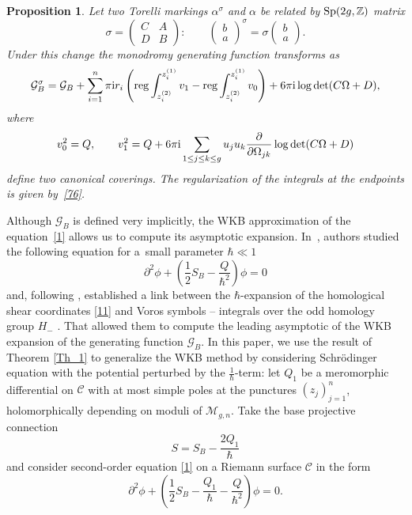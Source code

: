 \documentclass[pdftex]{sigma}
\numberwithin{equation}{section}
\newtheorem{Proposition}[Theorem]{Proposition}
\theoremstyle{definition}
\newcommand{\Z}{\mathbb{Z}}
\begin{document}
\begin{Proposition}
Let two Torelli markings $\alpha^\sigma$ and $\alpha$ be related by ${\rm Sp}(2g,\Z)$ matrix
\begin{equation*}
\sigma=\begin{pmatrix}
C & A \\
D & B
\end{pmatrix}\colon \qquad
\begin{pmatrix}
b \\
a
\end{pmatrix}^{\sigma}= \sigma
\begin{pmatrix}
b \\
a
\end{pmatrix}.
\end{equation*}
Under this change the monodromy generating function transforms as
\begin{equation*}
\mathcal{G}^{\sigma}_B=\mathcal{G}_B+\sum^n_{i=1}\pi {\rm i} r_i\left({\rm reg}\int^{z^{(1)}_i}_{z^{(2)}_i}v_1 -{\rm reg}\int^{z^{(1)}_i}_{z^{(2)}_i}v_0 \right) +6 \pi {\rm i} \log \det (C \Omega +D),
\end{equation*}
where
\begin{equation*}
v_0^2=Q, \qquad v_1^2=Q+6 \pi {\rm i} \sum_{1 \leq j \leq k \leq g}u_j u_k \frac{\partial}{\partial \Omega_{jk}}\log \det (C \Omega +D)
\end{equation*}
 define two canonical coverings. The regularization of the integrals at the endpoints is given by~\eqref{76}.
\end{Proposition}

Although $\mathcal{G}_B$ is defined very implicitly, the WKB approximation of the equation~\eqref{1} allows us to compute its asymptotic expansion. In~\cite{bertola2021wkb}, authors studied the following equation for a~small parameter $\hbar \ll 1$
\begin{equation*}\partial^2 \phi+\left(\frac{1}{2}S_B-\frac{Q}{\hbar^2}\right)\phi=0\end{equation*}
and, following \cite{voros_alegr, AlBrid}, established a link between the $\hbar$-expansion of the homological shear coordinates \eqref{11} and Voros symbols -- integrals over the odd homology group $H_-$ \cite{Voros}. That allowed them to compute the leading asymptotic of the WKB expansion of the generating function $\mathcal{G}_B$. In this paper, we use the result of Theorem \ref{Th_1} to generalize the WKB method by considering Schr\"odinger equation with the potential perturbed by the $\frac{1}{\hbar}$-term: let $Q_1$ be a meromorphic differential on $\mathcal{C}$ with at most simple poles at the punctures $(z_j)^n_{j=1}$, holomorphically depending on moduli of $\mathcal{M}_{g,n}$. Take the base projective connection
\begin{equation*}
S=S_B-\frac{2 Q_1}{\hbar} \end{equation*}
and consider second-order equation \eqref{1} on a Riemann surface $\mathcal{C}$ in the form
\begin{equation}\label{19}
\partial^2 \phi+\left(\frac{1}{2}S_B-\frac{{Q}_1}{\hbar}-\frac{Q}{\hbar^2}\right)\phi=0.
\end{equation}
\end{document}
